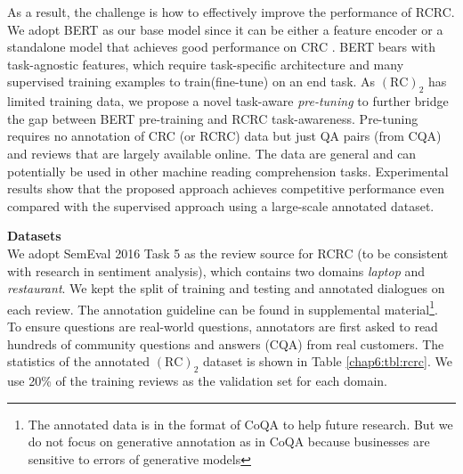 As a result, the challenge is how to effectively improve the performance of RCRC.
We adopt BERT \cite{devlin2018bert} as our base model since it can be either a feature encoder or a standalone model that achieves good performance on CRC \cite{reddy2018coqa}.
BERT bears with task-agnostic features, which require task-specific architecture and many supervised training examples to train(fine-tune) on an end task.
As $(\text{RC})_2$ has limited training data, 
we propose a novel task-aware \textit{pre-tuning} to further bridge the gap between BERT pre-training and RCRC task-awareness.
Pre-tuning requires no annotation of CRC (or RCRC) data but just QA pairs (from CQA) and reviews that are largely available online.
The data are general and can potentially be used in other machine reading comprehension tasks.
Experimental results show that the proposed approach achieves competitive performance even compared with the supervised approach using a large-scale annotated dataset.


\textbf{Datasets}\\
We adopt SemEval 2016 Task 5
as the review source for RCRC (to be consistent with research in sentiment analysis), which contains two domains \textit{laptop} and \textit{restaurant}.
We kept the split of training and testing and annotated dialogues on each review.
The annotation guideline can be found in supplemental material\footnote{The annotated data is in the format of CoQA \cite{reddy2018coqa} to help future research. But we do not focus on generative annotation as in CoQA because businesses are sensitive to errors of generative models}.
To ensure questions are real-world questions, annotators are first asked to read hundreds of community questions and answers (CQA) from real customers.
The statistics of the annotated $(\text{RC})_2$ dataset is shown in Table \ref{chap6:tbl:rcrc}.
We use 20\% of the training reviews as the validation set for each domain.

